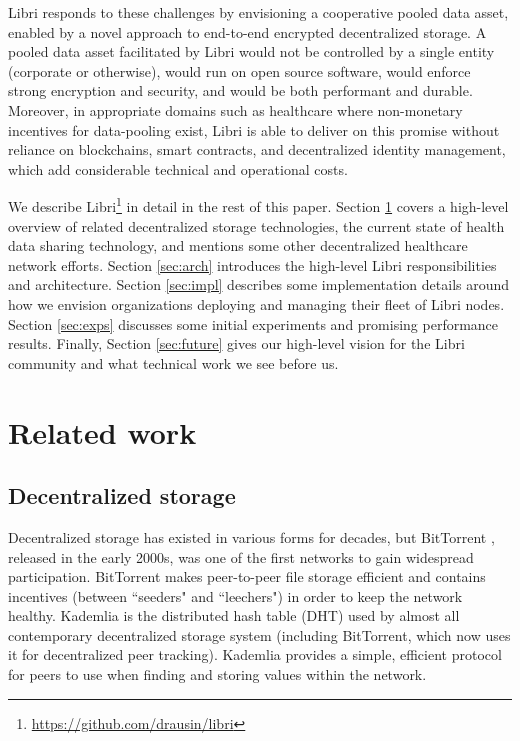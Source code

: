 \documentclass[10pt]{article}
\begin{document}
Libri responds to these challenges by envisioning a cooperative pooled data asset, enabled by a novel approach to end-to-end encrypted decentralized storage. A pooled data asset facilitated by Libri would not be controlled by a single entity (corporate or otherwise), would run on open source software, would enforce strong encryption and security, and would be both performant and durable. Moreover, in appropriate domains such as healthcare where non-monetary incentives for data-pooling exist, Libri is able to deliver on this promise without reliance on blockchains, smart contracts, and decentralized identity management, which add considerable technical and operational costs.

We describe Libri\footnote{\url{https://github.com/drausin/libri}} in detail in the rest of this paper. Section \ref{sec:related} covers a high-level overview of related decentralized storage technologies, the current state of health data sharing technology, and mentions some other decentralized healthcare network efforts. Section \ref{sec:arch} introduces the high-level Libri responsibilities and architecture. Section \ref{sec:impl} describes some implementation details around how we envision organizations deploying and managing their fleet of Libri nodes. Section \ref{sec:exps} discusses some initial experiments and promising performance results. Finally, Section \ref{sec:future} gives our high-level vision for the Libri community and what technical work we see before us.

\section{Related work}
\label{sec:related}

\subsection{Decentralized storage}
Decentralized storage has existed in various forms for decades, but BitTorrent \cite{bittorrent-protocol,bittorrent-review}, released in the early 2000s, was one of the first networks to gain widespread participation. BitTorrent makes peer-to-peer file storage efficient and contains incentives (between ``seeders" and ``leechers") in order to keep the network healthy. Kademlia \cite{kademlia} is the distributed hash table (DHT) used by almost all contemporary decentralized storage system (including BitTorrent, which now uses it for decentralized peer tracking). Kademlia provides a simple, efficient protocol for peers to use when finding and storing values within the network.
\end{document}
